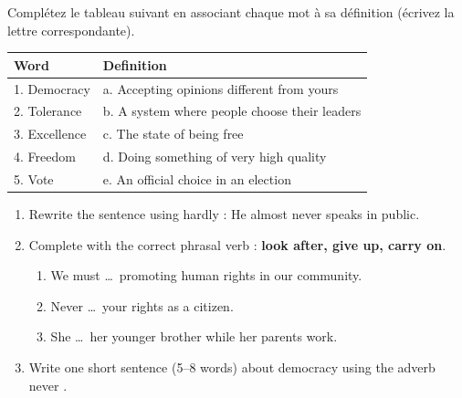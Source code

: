 \documentclass[11pt]{article}
\begin{document}
\begin{exercice}
Complétez le tableau suivant en associant chaque mot à sa définition (écrivez la lettre correspondante).

\begin{center}
\begin{tabular}{|l|l|}
\hline
\textbf{Word} & \textbf{Definition} \\
\hline
1. Democracy & a. Accepting opinions different from yours \\
2. Tolerance & b. A system where people choose their leaders \\
3. Excellence & c. The state of being free \\
4. Freedom & d. Doing something of very high quality \\
5. Vote & e. An official choice in an election \\
\hline
\end{tabular}
\end{center}
\end{exercice}

\begin{exercice}
\begin{enumerate}
  \item Rewrite the sentence using \og hardly \fg{} : \og He almost never speaks in public. \fg{}
  \item Complete with the correct phrasal verb : \textbf{look after, give up, carry on}.
  \begin{enumerate}
    \item We must \ldots\ promoting human rights in our community.
    \item Never \ldots\ your rights as a citizen.
    \item She \ldots\ her younger brother while her parents work.
  \end{enumerate}
  \item Write one short sentence (5--8 words) about democracy using the adverb \og never \fg{}.
\end{enumerate}
\end{exercice}
\end{document}
